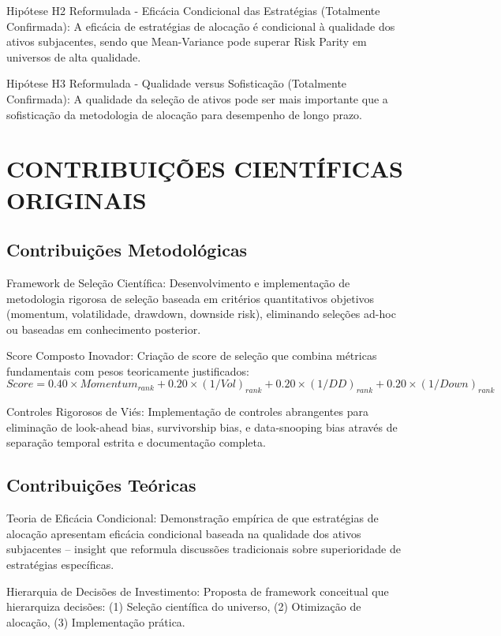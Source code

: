 Hipótese H2 Reformulada - Eficácia Condicional das Estratégias (Totalmente Confirmada): A eficácia de estratégias de alocação é condicional à qualidade dos ativos subjacentes, sendo que Mean-Variance pode superar Risk Parity em universos de alta qualidade.

Hipótese H3 Reformulada - Qualidade versus Sofisticação (Totalmente Confirmada): A qualidade da seleção de ativos pode ser mais importante que a sofisticação da metodologia de alocação para desempenho de longo prazo.

\section{CONTRIBUIÇÕES CIENTÍFICAS ORIGINAIS}

\subsection{Contribuições Metodológicas}

Framework de Seleção Científica: Desenvolvimento e implementação de metodologia rigorosa de seleção baseada em critérios quantitativos objetivos (momentum, volatilidade, drawdown, downside risk), eliminando seleções ad-hoc ou baseadas em conhecimento posterior.

Score Composto Inovador: Criação de score de seleção que combina métricas fundamentais com pesos teoricamente justificados:
\begin{equation}
Score = 0.40 \times Momentum_{rank} + 0.20 \times (1/Vol)_{rank} + 0.20 \times (1/DD)_{rank} + 0.20 \times (1/Down)_{rank}
\end{equation}

Controles Rigorosos de Viés: Implementação de controles abrangentes para eliminação de look-ahead bias, survivorship bias, e data-snooping bias através de separação temporal estrita e documentação completa.

\subsection{Contribuições Teóricas}

Teoria de Eficácia Condicional: Demonstração empírica de que estratégias de alocação apresentam eficácia condicional baseada na qualidade dos ativos subjacentes – insight que reformula discussões tradicionais sobre superioridade de estratégias específicas.

Hierarquia de Decisões de Investimento: Proposta de framework conceitual que hierarquiza decisões: (1) Seleção científica do universo, (2) Otimização de alocação, (3) Implementação prática.

